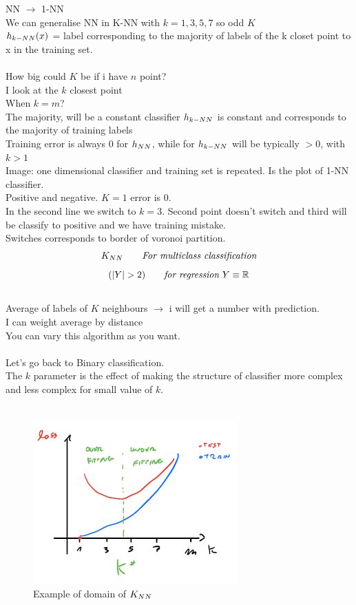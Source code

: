 \documentclass[../main.tex]{subfiles}
\begin{document}
NN $\rightarrow$ 1-NN\\
We can generalise NN in K-NN with $k = 1,3,5,7$ so odd $K$ \\
$h_{k-NN}(x)$ = label corresponding to the majority of labels of the k closet point to
x in the training set.\\\\
How big could $K$ be if i have $n$ point?\\
I look at the $k$ closest point\\
When $k = m$?\\
The majority, will be a constant classifier
$h_{k-NN}$ is constant and corresponds to the majority of training labels\\
Training error is always 0 for $h_{NN}$, while for $h_{k-NN}$ will be typically $>0$, with $k >
1$\\
Image: one dimensional classifier and training set is repeated.
Is the plot of 1-NN classifier.\\
Positive and negative.
$K = 1$ error is 0.\\
In the second line we switch to $k =3$. Second point doesn’t switch and third will
be classify to positive and we have training mistake.\\
Switches corresponds to border of voronoi partition.
$$K_{NN} \qquad \textit{For multiclass classification}$$
$$
(|Y| > 2 ) \qquad \textit{for regression } Y\equiv \mathbb{R}
$$
\\
Average of labels of $K$ neighbours $\rightarrow$ i will get a number with prediction.
\\
I can weight average by distance
\\
You can vary this algorithm as you want.\\\\
Let’s go back to Binary classification.\\
The $k$ parameter is the effect of making the structure of classifier more
complex and less complex for small value of $k$.\\\\
\begin{figure}[h]
    \centering
    \includegraphics[width=0.4\linewidth]{../img/lez4-img1.JPG}
    \caption{Example of domain of $K_{NN}$}
\end{figure}\\
\end{document}
